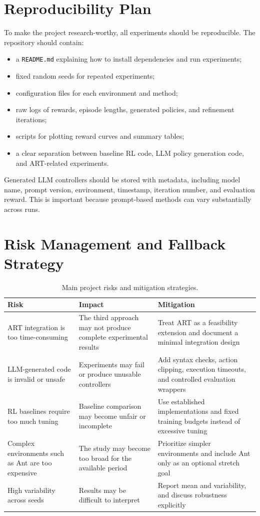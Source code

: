 \documentclass[12pt]{article}
\begin{document}
\section{Reproducibility Plan}

To make the project research-worthy, all experiments should be reproducible. The repository should contain:

\begin{itemize}
    \item a \texttt{README.md} explaining how to install dependencies and run experiments;
    \item fixed random seeds for repeated experiments;
    \item configuration files for each environment and method;
    \item raw logs of rewards, episode lengths, generated policies, and refinement iterations;
    \item scripts for plotting reward curves and summary tables;
    \item a clear separation between baseline RL code, LLM policy generation code, and ART-related experiments.
\end{itemize}

Generated LLM controllers should be stored with metadata, including model name, prompt version, environment, timestamp, iteration number, and evaluation reward. This is important because prompt-based methods can vary substantially across runs.

\section{Risk Management and Fallback Strategy}

\begin{table}[h]
\centering
\begin{tabularx}{\textwidth}{p{4.0cm} Y Y}
\toprule
\textbf{Risk} & \textbf{Impact} & \textbf{Mitigation} \\
\midrule
ART integration is too time-consuming & The third approach may not produce complete experimental results & Treat ART as a feasibility extension and document a minimal integration design \\
LLM-generated code is invalid or unsafe & Experiments may fail or produce unusable controllers & Add syntax checks, action clipping, execution timeouts, and controlled evaluation wrappers \\
RL baselines require too much tuning & Baseline comparison may become unfair or incomplete & Use established implementations and fixed training budgets instead of excessive tuning \\
Complex environments such as Ant are too expensive & The study may become too broad for the available period & Prioritize simpler environments and include Ant only as an optional stretch goal \\
High variability across seeds & Results may be difficult to interpret & Report mean and variability, and discuss robustness explicitly \\
\bottomrule
\end{tabularx}
\caption{Main project risks and mitigation strategies.}
\end{table}
\end{document}
